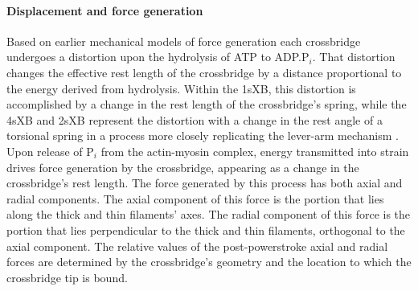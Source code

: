 \documentclass[]{article}
\begin{document}
\paragraph{Displacement and force generation} %
Based on earlier mechanical models of force generation \citep{Pate1989, Daniel1998, Tanner2007} each crossbridge undergoes a distortion upon the hydrolysis of ATP to ADP.P$_i$.  
That distortion changes the effective rest length of the crossbridge by a distance proportional to the energy derived from hydrolysis.  
Within the 1sXB, this distortion is accomplished by a change in the rest length of the crossbridge's spring, while the 4sXB and 2sXB represent the distortion with a change in the rest angle of a torsional spring in a process more closely replicating the lever-arm mechanism \citep{Reedy2000}.
Upon release of P$_i$ from the actin-myosin complex, energy transmitted into strain drives force generation by the crossbridge, appearing as a change in the crossbridge's rest length. 
The force generated by this process has both axial and radial components. 
The axial component of this force is the portion that lies along the thick and thin filaments' axes. 
The radial component of this force is the portion that lies perpendicular to the thick and thin filaments, orthogonal to the axial component. 
The relative values of the post-powerstroke axial and radial forces are determined by the crossbridge's geometry and the location to which the crossbridge tip is bound. 
\end{document}
